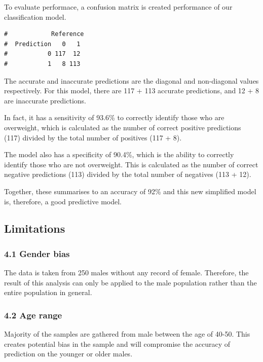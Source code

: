 \documentclass[a4paper,9pt,twocolumn,twoside,]{pinp}
\begin{document}
To evaluate performace, a confusion matrix is created performance of our
classification model.

\begin{ShadedResult}
\begin{verbatim}
#            Reference
#  Prediction   0   1
#           0 117  12
#           1   8 113
\end{verbatim}
\end{ShadedResult}

The accurate and inaccurate predictions are the diagonal and
non-diagonal values respectively. For this model, there are 117 + 113
accurate predictions, and 12 + 8 are inaccurate predictions.

In fact, it has a sensitivity of 93.6\% to correctly identify those who
are overweight, which is calculated as the number of correct positive
predictions (117) divided by the total number of positives (117 + 8).

The model also has a specificity of 90.4\%, which is the ability to
correctly identify those who are not overweight. This is calculated as
the number of correct negative predictions (113) divided by the total
number of negatives (113 + 12).

Together, these summarises to an accuracy of 92\% and this new
simplified model is, therefore, a good predictive model.

\hypertarget{limitations}{%
\subsection{Limitations}\label{limitations}}

\hypertarget{gender-bias}{%
\subsubsection{4.1 Gender bias}\label{gender-bias}}

The data is taken from 250 males without any record of female.
Therefore, the result of this analysis can only be applied to the male
population rather than the entire population in general.

\hypertarget{age-range}{%
\subsubsection{4.2 Age range}\label{age-range}}

Majority of the samples are gathered from male between the age of 40-50.
This creates potential bias in the sample and will compromise the
accuracy of prediction on the younger or older males.
\end{document}
